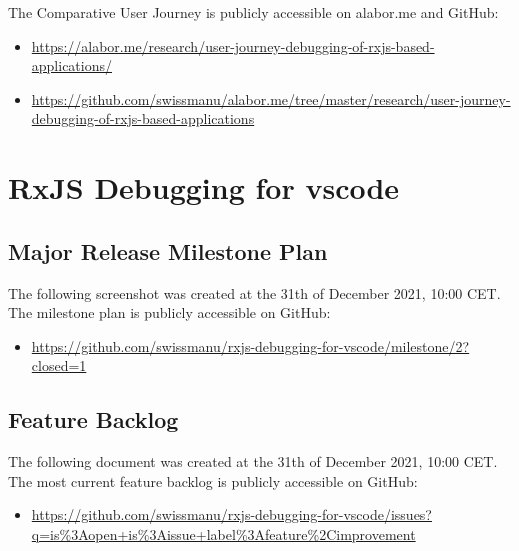 The Comparative User Journey is publicly accessible on alabor.me and GitHub:

\begin{itemize}
  \item \url{https://alabor.me/research/user-journey-debugging-of-rxjs-based-applications/}
  \item \url{https://github.com/swissmanu/alabor.me/tree/master/research/user-journey-debugging-of-rxjs-based-applications}
\end{itemize}












\section{RxJS Debugging for vscode}


\subsection{Major Release Milestone Plan \label{sec:major-milestone}}

The following screenshot was created at the 31th of December 2021, 10:00 CET. The milestone plan is publicly accessible on GitHub:

\begin{itemize}
  \item \url{https://github.com/swissmanu/rxjs-debugging-for-vscode/milestone/2?closed=1}
\end{itemize}













\subsection{Feature Backlog \label{sec:feature-backlog}}

The following document was created at the 31th of December 2021, 10:00 CET. The most current feature backlog is publicly accessible on GitHub:

\begin{itemize}
  \item \url{https://github.com/swissmanu/rxjs-debugging-for-vscode/issues?q=is\%3Aopen+is\%3Aissue+label\%3Afeature\%2Cimprovement}
\end{itemize}

